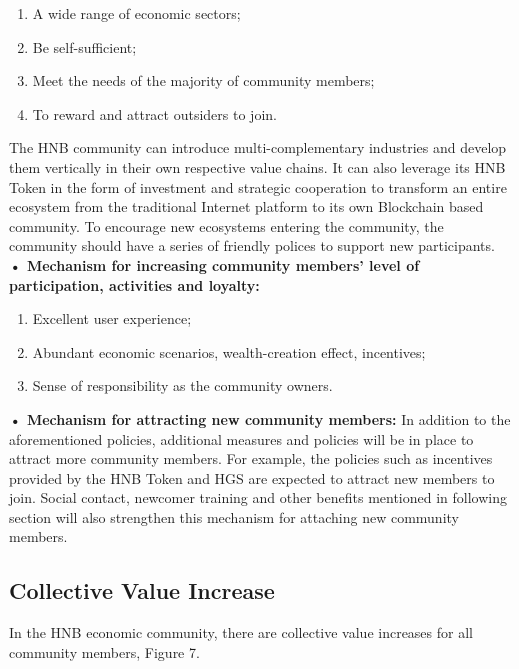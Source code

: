 \documentclass[fleqn,10pt]{SelfArx} %
\begin{document}
\begin{enumerate}[noitemsep] %
\item A wide range of economic sectors;
\item Be self-sufficient;
\item Meet the needs of the majority of community members;
\item To reward and attract outsiders to join.
\end{enumerate}

The HNB community can introduce multi-complementary industries and develop them vertically in their own respective value chains. It can also leverage its HNB Token in the form of investment and strategic cooperation to transform an entire ecosystem from the traditional Internet platform to its own Blockchain based community.  To encourage new ecosystems entering the community, the community should have a series of friendly polices to support new participants. \\

\textbf {•	Mechanism for increasing community members’ level of participation, activities and loyalty:}
\begin{enumerate}[noitemsep] %
\item Excellent user experience;
\item Abundant economic scenarios, wealth-creation effect, incentives;
\item Sense of responsibility as the community owners.
\end{enumerate}

\textbf {•	Mechanism for attracting new community members:}
In addition to the aforementioned policies, additional measures and policies will be in place to attract more community members. For example, the policies such as incentives provided by the HNB Token and HGS are expected to attract new members to join. Social contact, newcomer training and other benefits mentioned in following section will also strengthen this mechanism for attaching new community members. \\

\subsection{Collective Value Increase}

In the HNB economic community, there are collective value increases for all community members, Figure 7.
\end{document}
